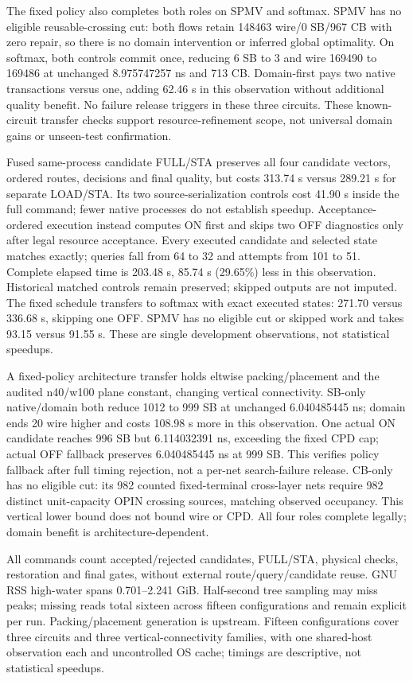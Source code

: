 \documentclass[conference,10pt]{IEEEtran}
\begin{document}
The fixed policy also completes both roles on SPMV and softmax. SPMV has no eligible reusable-crossing cut: both flows retain 148463 wire/0 SB/967 CB with zero repair, so there is no domain intervention or inferred global optimality. On softmax, both controls commit once, reducing 6 SB to 3 and wire 169490 to 169486 at unchanged 8.975747257 ns and 713 CB. Domain-first pays two native transactions versus one, adding 62.46 s in this observation without additional quality benefit. No failure release triggers in these three circuits. These known-circuit transfer checks support resource-refinement scope, not universal domain gains or unseen-test confirmation.

Fused same-process candidate FULL/STA preserves all four candidate vectors, ordered routes, decisions and final quality, but costs 313.74 s versus 289.21 s for separate LOAD/STA. Its two source-serialization controls cost 41.90 s inside the full command; fewer native processes do not establish speedup. Acceptance-ordered execution instead computes ON first and skips two OFF diagnostics only after legal resource acceptance. Every executed candidate and selected state matches exactly; queries fall from 64 to 32 and attempts from 101 to 51. Complete elapsed time is 203.48 s, 85.74 s (29.65\%) less in this observation. Historical matched controls remain preserved; skipped outputs are not imputed. The fixed schedule transfers to softmax with exact executed states: 271.70 versus 336.68 s, skipping one OFF. SPMV has no eligible cut or skipped work and takes 93.15 versus 91.55 s. These are single development observations, not statistical speedups.

A fixed-policy architecture transfer holds eltwise packing/placement and the audited n40/w100 plane constant, changing vertical connectivity. SB-only native/domain both reduce 1012 to 999 SB at unchanged 6.040485445 ns; domain ends 20 wire higher and costs 108.98 s more in this observation. One actual ON candidate reaches 996 SB but 6.114032391 ns, exceeding the fixed CPD cap; actual OFF fallback preserves 6.040485445 ns at 999 SB. This verifies policy fallback after full timing rejection, not a per-net search-failure release. CB-only has no eligible cut: its 982 counted fixed-terminal cross-layer nets require 982 distinct unit-capacity OPIN crossing sources, matching observed occupancy. This vertical lower bound does not bound wire or CPD. All four roles complete legally; domain benefit is architecture-dependent.

All commands count accepted/rejected candidates, FULL/STA, physical checks, restoration and final gates, without external route/query/candidate reuse. GNU RSS high-water spans 0.701--2.241 GiB. Half-second tree sampling may miss peaks; missing reads total sixteen across fifteen configurations and remain explicit per run. Packing/placement generation is upstream. Fifteen configurations cover three circuits and three vertical-connectivity families, with one shared-host observation each and uncontrolled OS cache; timings are descriptive, not statistical speedups.
\end{document}
